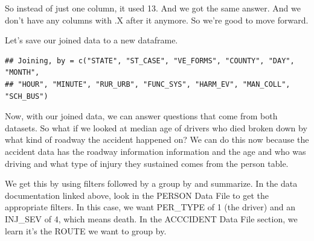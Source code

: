 \documentclass[]{book}
\newenvironment{Shaded}{\begin{snugshade}}{\end{snugshade}}
\newcommand{\DataTypeTok}[1]{\textcolor[rgb]{0.13,0.29,0.53}{#1}}
\newcommand{\DecValTok}[1]{\textcolor[rgb]{0.00,0.00,0.81}{#1}}
\newcommand{\KeywordTok}[1]{\textcolor[rgb]{0.13,0.29,0.53}{\textbf{#1}}}
\newcommand{\NormalTok}[1]{#1}
\newcommand{\OperatorTok}[1]{\textcolor[rgb]{0.81,0.36,0.00}{\textbf{#1}}}
\newcommand{\StringTok}[1]{\textcolor[rgb]{0.31,0.60,0.02}{#1}}
\begin{document}
So instead of just one column, it used 13. And we got the same answer. And we don't have any columns with .X after it anymore. So we're good to move forward.

Let's save our joined data to a new dataframe.

\begin{Shaded}
\end{Shaded}

\begin{verbatim}
## Joining, by = c("STATE", "ST_CASE", "VE_FORMS", "COUNTY", "DAY", "MONTH",
## "HOUR", "MINUTE", "RUR_URB", "FUNC_SYS", "HARM_EV", "MAN_COLL", "SCH_BUS")
\end{verbatim}

Now, with our joined data, we can answer questions that come from both datasets. So what if we looked at median age of drivers who died broken down by what kind of roadway the accident happened on?
We can do this now because the accident data has the roadway information information and the age and who was driving and what type of injury they sustained comes from the person table.

We get this by using filters followed by a group by and summarize. In the data documentation linked above, look in the PERSON Data File to get the appropriate filters. In this case, we want PER\_TYPE of 1 (the driver) and an INJ\_SEV of 4, which means death. In the ACCCIDENT Data File section, we learn it's the ROUTE we want to group by.

\begin{Shaded}
\end{Shaded}
\end{document}
